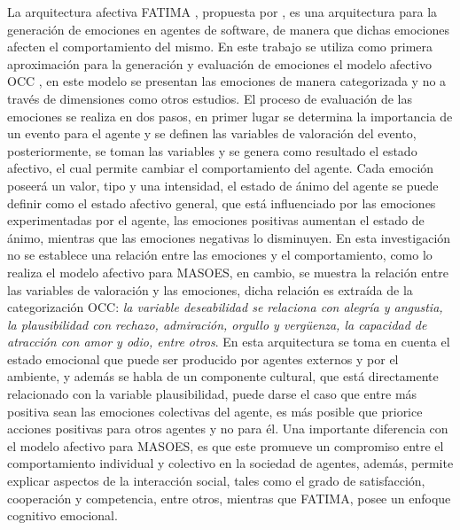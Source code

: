 La arquitectura afectiva FATIMA ,
propuesta por \cite{dias2014}, es una arquitectura para la
generación de emociones en agentes de software, de manera que dichas emociones
afecten el comportamiento del mismo. En este trabajo se utiliza como primera
aproximación para la generación y evaluación de emociones el modelo afectivo OCC
 \citep{ortony1990},
en este modelo se presentan las emociones de manera categorizada y no a través
de dimensiones como otros estudios. El proceso de evaluación de las emociones se
realiza en dos pasos, en primer lugar se determina la importancia de un evento
para el agente y se definen las variables de valoración del evento,
posteriormente, se toman las variables y se genera como resultado el estado
afectivo, el cual permite cambiar el comportamiento del agente. Cada emoción
poseerá un valor, tipo y una intensidad, el estado de ánimo del agente se puede
definir como el estado afectivo general, que está influenciado por las emociones
experimentadas por el agente, las emociones positivas aumentan el estado de
ánimo, mientras que las emociones negativas lo disminuyen. En esta investigación
no se establece una relación entre las emociones y el comportamiento, como lo
realiza el modelo afectivo para MASOES, en cambio, se muestra la relación entre
las variables de valoración  y las emociones, dicha relación es extraída de la
categorización OCC: \textit{la variable deseabilidad se relaciona con alegría y
angustia, la plausibilidad con rechazo, admiración, orgullo y vergüenza, la
capacidad de atracción con amor y odio, entre otros}. En esta arquitectura se
toma en cuenta el estado emocional que puede ser producido por agentes externos
y por el ambiente, y además se habla de un componente cultural, que está
directamente relacionado con la variable plausibilidad, puede darse el caso que
entre más positiva sean las emociones colectivas del agente, es más posible que
priorice acciones positivas para otros agentes y no  para él. Una importante
diferencia con el modelo afectivo para MASOES, es que este promueve un
compromiso entre el comportamiento individual y colectivo en la sociedad de
agentes,  además, permite explicar aspectos de la interacción social, tales como
el grado de satisfacción, cooperación y competencia, entre otros, mientras que
FATIMA, posee un enfoque cognitivo emocional.

